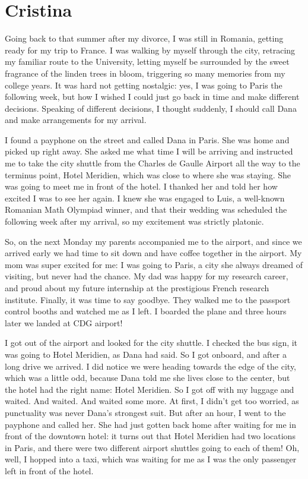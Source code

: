 \documentclass[12pt]{book}
\begin{document}
\section{Cristina}

Going back to that summer after my divorce, I was still in Romania,
getting ready for my trip to France. I was walking by myself through the
city, retracing my familiar route to the University, letting myself be
surrounded by the sweet fragrance of the linden trees in bloom,
triggering so many memories from my college years. It was hard not
getting nostalgic: yes, I was going to Paris the following week, but how
I wished I could just go back in time and make different decisions.
Speaking of different decisions, I thought suddenly, I should call Dana
and make arrangements for my arrival.

I found a payphone on the street and called Dana in Paris. She was home
and picked up right away. She asked me what time I will be arriving and
instructed me to take the city shuttle from the Charles de Gaulle
Airport all the way to the terminus point, Hotel Meridien, which was
close to where she was staying. She was going to meet me in front of the
hotel. I thanked her and told her how excited I was to see her again. I
knew she was engaged to Luis, a well-known Romanian Math Olympiad
winner, and that their wedding was scheduled the following week after my
arrival, so my excitement was strictly platonic.

So, on the next Monday my parents accompanied me to the airport, and
since we arrived early we had time to sit down and have coffee together
in the airport. My mom was super excited for me: I was going to Paris, a
city she always dreamed of visiting, but never had the chance. My dad
was happy for my research career, and proud about my future internship
at the prestigious French research institute. Finally, it was time to
say goodbye. They walked me to the passport control booths and watched
me as I left. I boarded the plane and three hours later we landed at CDG
airport!

I got out of the airport and looked for the city shuttle. I checked the
bus sign, it was going to Hotel Meridien, as Dana had said. So I got
onboard, and after a long drive we arrived. I did notice we were heading
towards the edge of the city, which was a little odd, because Dana told
me she lives close to the center, but the hotel had the right name:
Hotel Meridien. So I got off with my luggage and waited. And waited. And
waited some more. At first, I didn't get too worried, as punctuality was
never Dana's strongest suit. But after an hour, I went to the payphone
and called her. She had just gotten back home after waiting for me in
front of the downtown hotel: it turns out that Hotel Meridien had two
locations in Paris, and there were two different airport shuttles going
to each of them! Oh, well, I hopped into a taxi, which was waiting for
me as I was the only passenger left in front of the hotel.
\end{document}

